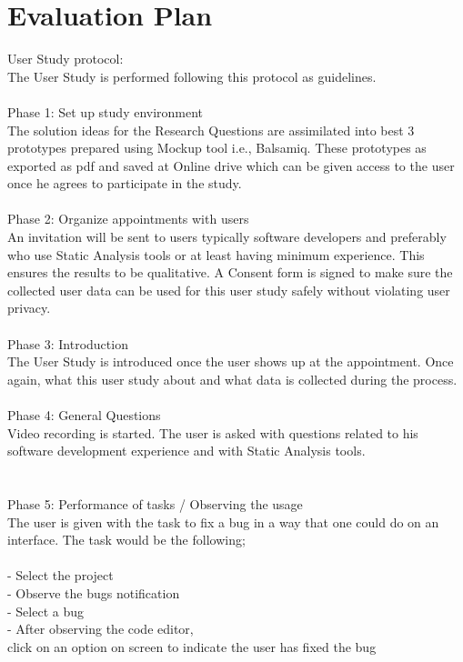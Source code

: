\chapter{Evaluation Plan}
\label{ch:evaluationplan} 

User Study protocol: \\

The User Study is performed following this protocol as guidelines. \\\\

Phase 1: Set up study environment \\

The solution ideas for the Research Questions are assimilated into best 3 prototypes prepared using Mockup tool i.e., Balsamiq. These prototypes as exported as pdf and saved at Online drive which can be given access to the user once he agrees to participate in the study. \\\\

Phase 2: Organize appointments with users \\

An invitation will be sent to users typically software developers and preferably who use Static Analysis tools or at least having minimum experience. This ensures the results to be qualitative.
A Consent form is signed to make sure the collected user data can be used for this user study safely without violating user privacy. \\\\

Phase 3: Introduction \\

The User Study is introduced once the user shows up at the appointment. Once again, what this user study about and what data is collected during the process. \\\\

Phase 4: General Questions \\

Video recording is started. The user is asked with questions related to his software development experience and with Static Analysis tools.  \\\\\\

Phase 5: Performance of tasks / Observing the usage \\

The user is given with the task to fix a bug in a way that one could do on an interface. The task would be the following; \\\\
-	Select the project \\
-	Observe the bugs notification \\
-	Select a bug \\
-	After observing the code editor, \\
click on an option on screen to indicate the user has fixed the bug \\

